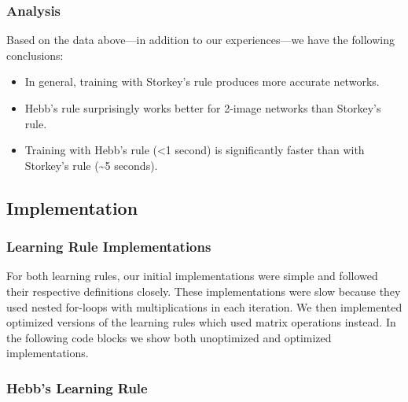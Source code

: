 \documentclass[11pt]{article}
\providecommand{\tightlist}{%
  \setlength{\itemsep}{0pt}\setlength{\parskip}{0pt}}
\begin{document}
\subsubsection{Analysis}\label{analysis}

Based on the data above---in addition to our experiences---we
have the following conclusions:

\begin{itemize}
\item
  In general, training with Storkey's rule produces more accurate
  networks.
\item
  Hebb's rule surprisingly works better for 2-image networks than
  Storkey's rule.
\item
  Training with Hebb's rule (\textless{}1 second) is significantly
  faster than with Storkey's rule (\textasciitilde{}5 seconds).
\end{itemize}

\pagebreak

\subsection{Implementation}\label{implementation}

\subsubsection{Learning Rule
Implementations}\label{learning-rule-implementations}

For both learning rules, our initial implementations were simple and
followed their respective definitions closely. These implementations
were slow because they used nested for-loops with multiplications in
each iteration. We then implemented optimized versions of the learning
rules which used matrix operations instead. In the following code blocks
we show both unoptimized and optimized implementations.

\subsubsection{Hebb's Learning Rule}\label{hebbs-learning-rule}
\end{document}
